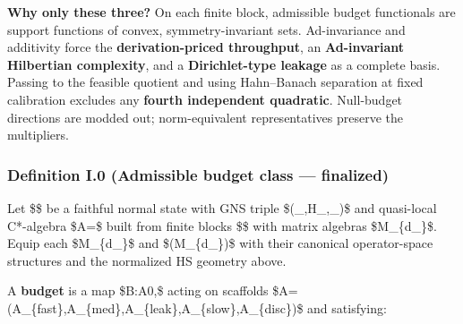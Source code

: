 \documentclass[
]{article}
\numberwithin{equation}{section}
\begin{document}
\textbf{Why only these three?} On each finite block, admissible budget
functionals are support functions of convex, symmetry-invariant sets.
Ad-invariance and additivity force the \textbf{derivation-priced
throughput}, an \textbf{Ad-invariant Hilbertian complexity}, and a
\textbf{Dirichlet-type leakage} as a complete basis. Passing to the
feasible quotient and using Hahn--Banach separation at fixed calibration
excludes any \textbf{fourth independent quadratic}. Null-budget
directions are modded out; norm-equivalent representatives preserve the
multipliers.

\hypertarget{definition-i.0-admissible-budget-class-finalized}{%
\subsubsection{Definition I.0 (Admissible budget class ---
finalized)}\label{definition-i.0-admissible-budget-class-finalized}}

Let \$\omega\$ be a faithful normal state with GNS triple
\$(\pi\_\omega,\mathcal H\_\omega,\Omega\_\omega)\$ and quasi-local
C*-algebra
\$\mathcal A=\$ built
from finite blocks \$\Lambda\$ with matrix algebras
\$M\_\{d\_\Lambda\}\$. Equip each \$M\_\{d\_\Lambda\}\$ and
\$(M\_\{d\_\Lambda\})\$ with their canonical operator-space
structures and the normalized HS geometry above.

A \textbf{budget} is a map \$\mathcal B:\mathcal A\to{[}0,\infty{]}\$
acting on scaffolds
\$A=(A\_\{\rm fast\},A\_\{\rm med\},A\_\{\rm leak\},A\_\{\rm slow\},A\_\{\rm disc\})\$
and satisfying:
\end{document}
